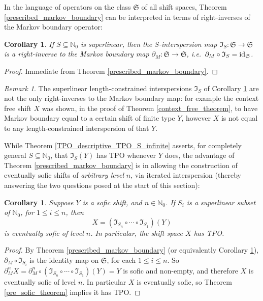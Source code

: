 \documentclass[reqno,11pt]{amsart}
\newtheorem{cor}[thm]{Corollary}
\theoremstyle{definition}
\theoremstyle{remark}
\theoremstyle{remark}
\newtheorem{rem}[thm]{Remark}
\def \N {\mathbb N}
\def\s{\mathfrak{S}}
\def\i{\mathfrak{I}}
\numberwithin{equation}{section}
\begin{document}
In the language of operators on the class $\s$ of all shift spaces, Theorem \ref{prescribed_markov_boundary}
can be interpreted in terms of right-inverses of the Markov boundary operator:


\begin{cor}\label{right_inverse}
If $S\subseteq \N_0$ is superlinear, then 
the $S$-interspersion map $\i_S:\s\to\s$ is a right-inverse
to the Markov boundary map $\partial_M:\s\to\s$, i.e.~$\partial_M\circ\i_S={\rm id}_\s$.
\end{cor}
\begin{proof}
Immediate from Theorem \ref{prescribed_markov_boundary}.
\end{proof}

\begin{rem}
The superlinear length-constrained interspersions $\i_S$ of Corollary \ref{right_inverse} are not the only right-inverses
to the Markov boundary map: for example the context free shift $X$ was shown, in the proof
of Theorem \ref{context_free_theorem}, to have Markov boundary equal to a certain shift of finite type $Y$,
however $X$ is not equal to any length-constrained interspersion of that $Y$.
\end{rem}


While Theorem \ref{TPO_descriptive_TPO_S_infinite} asserts, for completely general $S\subseteq\N_0$, that $\i_S(Y)$ has TPO whenever $Y$ does, the advantage of Theorem \ref{prescribed_markov_boundary}
is in allowing the construction of eventually sofic shifts of \emph{arbitrary level} $n$, 
via iterated interspersion (thereby answering the two questions posed at the start of this section):

\begin{cor}\label{superlinear_eventually_sofic_thm}
Suppose $Y$ is a sofic shift,  and $n\in\N_0$.
If $S_i$ is a superlinear subset of $\N_0$, for $1\le i\le n$,
 then
$$X= (\i_{S_n} \circ \cdots \circ \i_{S_1}) (Y)$$ 
is eventually sofic of level $n$.
In particular, the shift space $X$ has TPO.
\end{cor}
\begin{proof}
By
Theorem \ref{prescribed_markov_boundary} (or equivalently Corollary \ref{right_inverse}),
$\partial_M\circ \i_{S_i}$ is the identity map on $\s$, for each $1\le i\le n$.
So
 $\partial_M^n X = \partial_M^n \circ (\i_{S_n} \circ \cdots \circ \i_{S_1}) (Y)=Y$ is sofic and non-empty, 
and therefore $X$ is eventually sofic of level $n$.
In particular $X$ is eventually sofic, so Theorem \ref{pre_sofic_theorem} implies it has TPO.
\end{proof}
\end{document}
